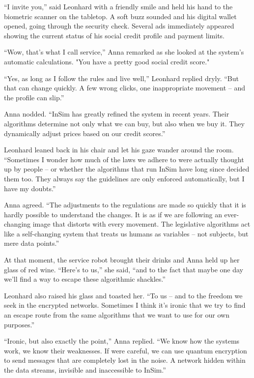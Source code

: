 \documentclass[
]{article}
\begin{document}
``I invite you,'' said Leonhard with a friendly smile and held his hand
to the biometric scanner on the tabletop. A soft buzz sounded and his
digital wallet opened, going through the security check. Several ads
immediately appeared showing the current status of his social credit
profile and payment limits.

``Wow, that's what I call service,'' Anna remarked as she looked at the
system's automatic calculations. "You have a pretty good social credit
score."

``Yes, as long as I follow the rules and live well,'' Leonhard replied
dryly. ``But that can change quickly. A few wrong clicks, one
inappropriate movement -- \hspace{0pt}\hspace{0pt}and the profile can
slip.''

Anna nodded. ``InSim has greatly refined the system in recent years.
Their algorithms determine not only what we can buy, but also when we
buy it. They dynamically adjust prices based on our credit scores.''

Leonhard leaned back in his chair and let his gaze wander around the
room. ``Sometimes I wonder how much of the laws we adhere to were
actually thought up by people -- or whether the algorithms that run
InSim have long since decided them too. They always say the guidelines
are only enforced automatically, but I have my doubts.''

Anna agreed. ``The adjustments to the regulations are made so quickly
that it is hardly possible to understand the changes. It is as if we are
following an ever-changing image that distorts with every movement. The
legislative algorithms act like a self-changing system that treats us
humans as variables -- not subjects, but mere data points.''

At that moment, the service robot brought their drinks and Anna held up
her glass of red wine. ``Here's to us,'' she said, ``and to the fact
that maybe one day we'll find a way to escape these algorithmic
shackles.''

Leonhard also raised his glass and toasted her. ``To us -- and to the
freedom we seek in the encrypted networks. Sometimes I think it's ironic
that we try to find an escape route from the same algorithms that we
want to use for our own purposes.''

``Ironic, but also exactly the point,'' Anna replied. ``We know how the
systems work, we know their weaknesses. If we\textquotesingle re
careful, we can use quantum encryption to send messages that are
completely lost in the noise. A network hidden within the data streams,
invisible and inaccessible to InSim.''
\end{document}
